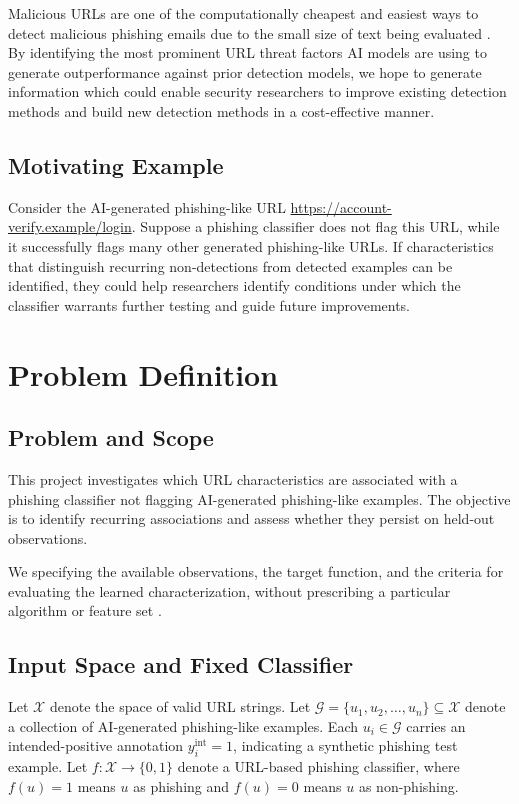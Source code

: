 \documentclass[sigconf]{acmart}
\begin{document}
\begin{bibunit}
Malicious URLs are one of the computationally cheapest and easiest ways to detect malicious phishing emails due to the small size of text being evaluated \cite{kustiawan2025}. By identifying the most prominent URL threat factors AI models are using to generate outperformance against prior detection models, we hope to generate information which could enable security researchers to improve existing detection methods and build new detection methods in a cost-effective manner.

\subsection{Motivating Example}
Consider the AI-generated phishing-like URL
\url{https://account-verify.example/login}.
Suppose a phishing classifier does not flag this URL, while it
successfully flags many other generated phishing-like URLs.
If characteristics that distinguish recurring non-detections from
detected examples can be identified, they could help researchers
identify conditions under which the classifier warrants further
testing and guide future improvements.
\section{Problem Definition}

\subsection{Problem and Scope}

This project investigates which URL characteristics are associated
with a phishing classifier not flagging AI-generated phishing-like examples. The objective is to identify recurring associations and assess whether they persist on held-out observations.

We specifying the available observations, the target function, and the criteria for evaluating the learned characterization, without prescribing a particular algorithm or feature set
\cite{mitchell1997machine}.


\subsection{Input Space and Fixed Classifier}

Let $\mathcal{X}$ denote the space of valid URL strings. Let $\mathcal{G} = \{u_1, u_2, \ldots, u_n\} \subseteq \mathcal{X}$ denote a collection of AI-generated phishing-like examples. Each
$u_i \in \mathcal{G}$ carries an intended-positive annotation
$y_i^{\mathrm{int}} = 1$, indicating a synthetic phishing test example. Let $f:\mathcal{X}\rightarrow\{0,1\}$ denote a URL-based phishing classifier, where $f(u)=1$ means $u$ as phishing and $f(u)=0$ means $u$ as non-phishing.


\end{bibunit}
\end{document}
